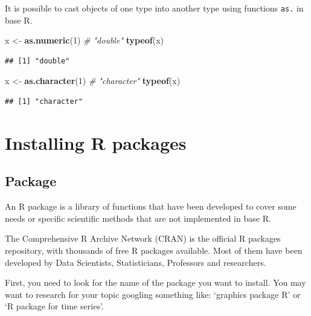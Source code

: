 \documentclass[
]{book}
\newenvironment{Shaded}{\begin{snugshade}}{\end{snugshade}}
\newcommand{\CommentTok}[1]{\textcolor[rgb]{0.56,0.35,0.01}{\textit{#1}}}
\newcommand{\DecValTok}[1]{\textcolor[rgb]{0.00,0.00,0.81}{#1}}
\newcommand{\FunctionTok}[1]{\textcolor[rgb]{0.13,0.29,0.53}{\textbf{#1}}}
\newcommand{\NormalTok}[1]{#1}
\newcommand{\OtherTok}[1]{\textcolor[rgb]{0.56,0.35,0.01}{#1}}
\begin{document}
It is possible to cast objects of one type into another type using functions \texttt{as.} in base R.

\begin{Shaded}
\begin{Highlighting}[]
\NormalTok{x }\OtherTok{\textless{}{-}} \FunctionTok{as.numeric}\NormalTok{(}\DecValTok{1}\NormalTok{) }\CommentTok{\# "double"}
\FunctionTok{typeof}\NormalTok{(x) }
\end{Highlighting}
\end{Shaded}

\begin{verbatim}
## [1] "double"
\end{verbatim}

\begin{Shaded}
\begin{Highlighting}[]
\NormalTok{x }\OtherTok{\textless{}{-}} \FunctionTok{as.character}\NormalTok{(}\DecValTok{1}\NormalTok{) }\CommentTok{\# "character"}
\FunctionTok{typeof}\NormalTok{(x)}
\end{Highlighting}
\end{Shaded}

\begin{verbatim}
## [1] "character"
\end{verbatim}

\hypertarget{installing-r-packages}{%
\chapter{Installing R packages}\label{installing-r-packages}}

\hypertarget{package}{%
\section{Package}\label{package}}

An R package is a library of functions that have been developed to cover some needs or specific scientific methods that are not implemented in base R.

The Comprehensive R Archive Network (CRAN) is the official R packages repository, with thousands of free R packages available. Most of them have been developed by Data Scientists, Statisticians, Professors and researchers.

First, you need to look for the name of the package you want to install. You may want to research for your topic googling something like: `graphics package R' or `R package for time series'.
\end{document}
